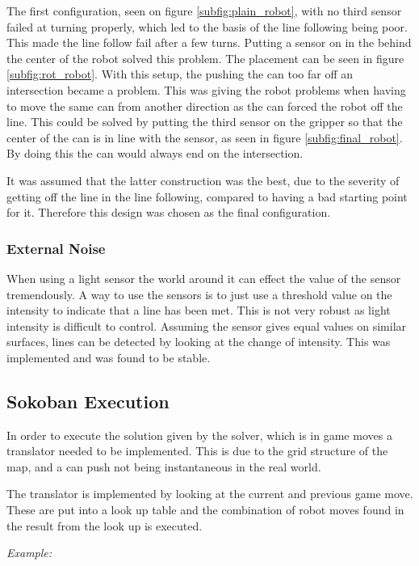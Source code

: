 The first configuration, seen on figure \ref{subfig:plain_robot}, with no third sensor failed at turning properly, which led to the basis of the line following being poor. This made the line follow fail after a few turns. Putting a sensor on in the behind the center of the robot solved this problem. The placement can be seen in figure \ref{subfig:rot_robot}. 
With this setup, the pushing the can too far off an intersection became a problem.
This was giving the robot problems when having to move the same can from another direction as the can forced the robot off the line.
This could be solved by putting the third sensor on the gripper so that the center of the can is in line with the sensor, as seen in figure \ref{subfig:final_robot}. 
By doing this the can would always end on the intersection. 

It was assumed that the latter construction was the best, due to the severity of getting off the line in the line following, compared to having a bad starting point for it. Therefore this design was chosen as the final configuration.

\subsubsection{External Noise}
When using a light sensor the world around it can effect the value of the sensor tremendously.
A way to use the sensors is to just use a threshold value on the intensity to indicate that a line has been met.
This is not very robust as light intensity is difficult to control.
Assuming the sensor gives equal values on similar surfaces, lines can be detected by looking at the change of intensity.
This was implemented and was found to be stable.

\subsection{Sokoban Execution}

In order to execute the solution given by the solver, which is in game moves a translator needed to be implemented. This is due to the grid structure of the map, and a can push not being instantaneous in the real world.

The translator is implemented by looking at the current and previous game move. These are put into a look up table and the combination of robot moves found in the result from the look up is executed. 

\vspace{10pt}
{\large \textit{Example:}}

